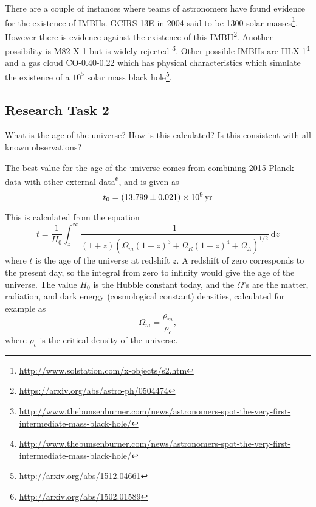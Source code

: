 \documentclass[a4paper]{article} %
\begin{document}
There are a couple of instances where teams of astronomers have found evidence for the existence of IMBHs. GCIRS 13E in 2004 said to be 1300 solar masses\footnote{\url{http://www.solstation.com/x-objects/s2.htm}}. However there is evidence against the existence of this IMBH\footnote{\url{https://arxiv.org/abs/astro-ph/0504474}}. Another possibility is M82 X-1 but is widely rejected \footnote{\url{http://www.thebunsenburner.com/news/astronomers-spot-the-very-first-intermediate-mass-black-hole/}}. Other possible IMBHs are HLX-1\footnote{\url{http://www.thebunsenburner.com/news/astronomers-spot-the-very-first-intermediate-mass-black-hole/}} and a gas cloud CO-0.40-0.22 which has physical characteristics which simulate the existence of a $10^5$ solar mass black hole\footnote{\url{http://arxiv.org/abs/1512.04661}}.



\subsection{Research Task 2}
\begin{framed}
What is the age of the universe? How is this calculated? Is this consistent with all known observations?
\end{framed}

The best value for the age of the universe comes from combining 2015 Planck data with other external data\footnote{\url{http://arxiv.org/abs/1502.01589}}, and is given as
\begin{equation}
t_{0}=(13.799\pm 0.021)\times \SI{d9}{yr}
\end{equation}

This is calculated from the equation
\begin{equation}
t=\frac{1}{H_0}\int^{\infty}_{z}\frac{1}{(1+z)\left(\Omega_m(1+z)^3+\Omega_R(1+z)^4+\Omega_{\Lambda}\right)^{1/2}}
~\text{d}z
\end{equation}
where $t$ is the age of the universe at redshift $z$. A redshift of zero corresponds to the present day, so the integral from zero to infinity would give the age of the universe. The value $H_0$ is the Hubble constant today, and the $\Omega$'s are the matter, radiation, and dark energy (cosmological constant) densities, calculated for example as
\begin{equation}
\Omega_m=\frac{\rho_m}{\rho_c},
\end{equation}
where $\rho_c$ is the critical density of the universe. 
\end{document}
